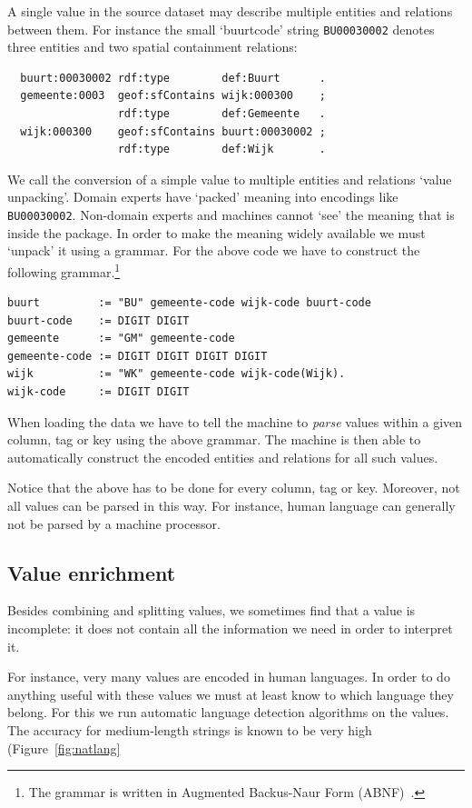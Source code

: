 \documentclass[a4paper]{scrartcl}
\newcommand{\textt}[1]{{\small \texttt{#1}}}
\begin{document}
A single value in the source dataset may describe multiple entities
and relations between them.  For instance the small `buurtcode' string
\textt{BU00030002} denotes three entities and two spatial containment
relations:

\begin{verbatim}
  buurt:00030002 rdf:type        def:Buurt      .
  gemeente:0003  geof:sfContains wijk:000300    ;
                 rdf:type        def:Gemeente   .
  wijk:000300    geof:sfContains buurt:00030002 ;
                 rdf:type        def:Wijk       .
\end{verbatim}

We call the conversion of a simple value to multiple entities and
relations `value unpacking'.  Domain experts have `packed' meaning
into encodings like \texttt{BU00030002}.  Non-domain experts and
machines cannot `see' the meaning that is inside the package.  In
order to make the meaning widely available we must `unpack' it using a
grammar.  For the above code we have to construct the following
grammar.\footnote{The grammar is written in Augmented Backus-Naur Form
  (ABNF)~\cite{Crocker2008}.}

\begin{verbatim}
buurt         := "BU" gemeente-code wijk-code buurt-code
buurt-code    := DIGIT DIGIT
gemeente      := "GM" gemeente-code
gemeente-code := DIGIT DIGIT DIGIT DIGIT
wijk          := "WK" gemeente-code wijk-code(Wijk).
wijk-code     := DIGIT DIGIT
\end{verbatim}

When loading the data we have to tell the machine to \emph{parse}
values within a given column, tag or key using the above grammar.  The
machine is then able to automatically construct the encoded entities
and relations for all such values.

Notice that the above has to be done for every column, tag or key.
Moreover, not all values can be parsed in this way.  For instance,
human language can generally not be parsed by a machine processor.


\subsection{Value enrichment}

Besides combining and splitting values, we sometimes find that a value
is incomplete: it does not contain all the information we need in
order to interpret it.

For instance, very many values are encoded in human languages.  In
order to do anything useful with these values we must at least know to
which language they belong.  For this we run automatic language
detection algorithms on the values.  The accuracy for medium-length
strings is known to be very high (Figure~\ref{fig:natlang}
\end{document}
